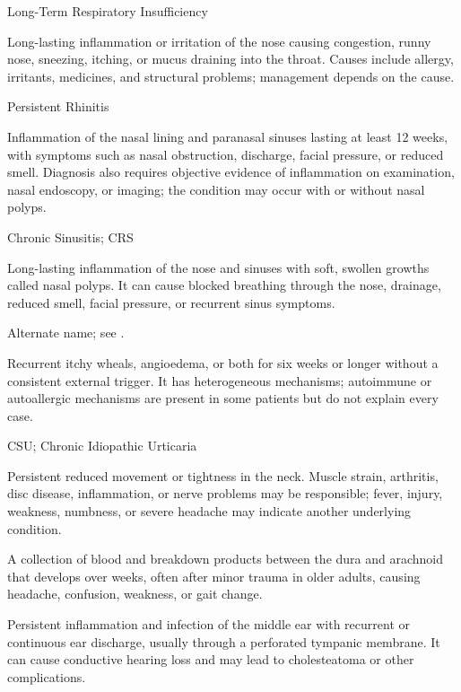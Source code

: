 \synonyms
Long-Term Respiratory Insufficiency

 Long-lasting inflammation or irritation of the nose causing congestion, runny nose, sneezing, itching, or mucus draining into the throat. Causes include allergy, irritants, medicines, and structural problems; management depends on the cause.

\synonyms
Persistent Rhinitis

 Inflammation of the nasal lining and
paranasal sinuses lasting at least 12 weeks, with symptoms such as nasal
obstruction, discharge, facial pressure, or reduced smell. Diagnosis also
requires objective evidence of inflammation on examination, nasal endoscopy,
or imaging; the condition may occur with or without nasal polyps.

\synonyms
Chronic Sinusitis; CRS

 Long-lasting inflammation of the nose and sinuses with soft, swollen growths called nasal polyps. It can cause blocked breathing through the nose, drainage, reduced smell, facial pressure, or recurrent sinus symptoms.

 Alternate name; see .

 Recurrent itchy wheals, angioedema,
or both for six weeks or longer without a consistent external trigger. It has
heterogeneous mechanisms; autoimmune or autoallergic mechanisms are present
in some patients but do not explain every case.

\synonyms
CSU; Chronic Idiopathic Urticaria

 Persistent reduced movement or tightness in the neck. Muscle strain, arthritis, disc disease, inflammation, or nerve problems may be responsible; fever, injury, weakness, numbness, or severe headache may indicate another underlying condition.

 A collection of blood and breakdown products between the dura and arachnoid that develops over weeks, often after minor trauma in older adults, causing headache, confusion, weakness, or gait change.

 Persistent inflammation and infection of the middle ear with recurrent or continuous ear discharge,
usually through a perforated tympanic membrane. It can cause conductive hearing loss and
may lead to cholesteatoma or other complications.

